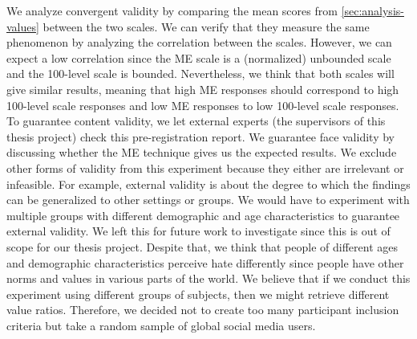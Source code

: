 We analyze convergent validity by comparing the mean scores from \ref{sec:analysis-values} between the two scales. We can verify that they measure the same phenomenon by analyzing the correlation between the scales. However, we can expect a low correlation since the ME scale is a (normalized) unbounded scale and the 100-level scale is bounded. Nevertheless, we think that both scales will give similar results, meaning that high ME responses should correspond to high 100-level scale responses and low ME responses to low 100-level scale responses. To guarantee content validity, we let external experts (the supervisors of this thesis project) check this pre-registration report. We guarantee face validity by discussing whether the ME technique gives us the expected results. We exclude other forms of validity from this experiment because they either are irrelevant or infeasible. For example, external validity is about the degree to which the findings can be generalized to other settings or groups. We would have to experiment with multiple groups with different demographic and age characteristics to guarantee external validity. We left this for future work to investigate since this is out of scope for our thesis project. Despite that, we think that people of different ages and demographic characteristics perceive hate differently since people have other norms and values in various parts of the world. We believe that if we conduct this experiment using different groups of subjects, then we might retrieve different value ratios. Therefore, we decided not to create too many participant inclusion criteria but take a random sample of global social media users.


